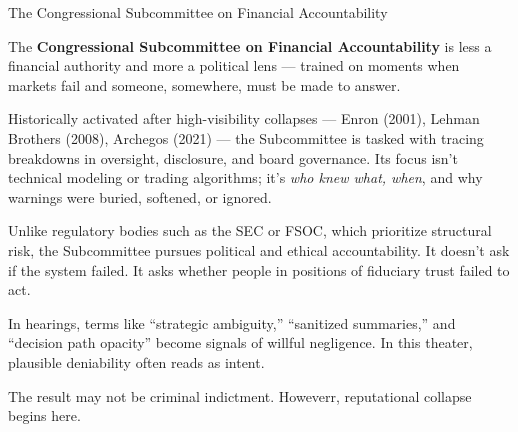 \medskip

\begin{HistoricalSidebar}{The Congressional Subcommittee on Financial Accountability}

  The \textbf{Congressional Subcommittee on Financial Accountability} is less a financial authority and more a political 
  lens — trained on moments when markets fail and someone, somewhere, must be made to answer.

  \medskip
  
  Historically activated after high-visibility collapses --- Enron (2001), Lehman Brothers (2008), Archegos (2021) --- the 
  Subcommittee is tasked with tracing breakdowns in oversight, disclosure, and board governance. Its focus isn’t technical 
  modeling or trading algorithms; it’s \textit{who knew what, when}, and why warnings were buried, softened, or ignored.

  \medskip
  
  Unlike regulatory bodies such as the SEC or FSOC, which prioritize structural risk, the Subcommittee pursues political 
  and ethical accountability. It doesn’t ask if the system failed. It asks whether people in positions of fiduciary trust 
  failed to act.

  \medskip
  
  In hearings, terms like ``strategic ambiguity,'' ``sanitized summaries,'' and ``decision path opacity'' become signals 
  of willful negligence. In this theater, plausible deniability often reads as intent.

  \medskip
  
  The result may not be criminal indictment. Howeverr, reputational collapse begins here.
  
\end{HistoricalSidebar}

\medskip


